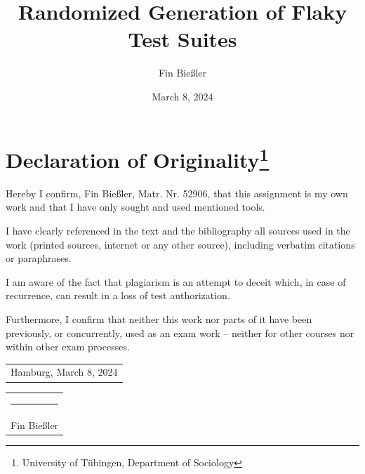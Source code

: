 \documentclass[
fancyheadings, %
%
%
]{stsreprt}
\author{Fin Bießler}
\title{Randomized Generation of Flaky Test Suites}
\date{March 8, 2024}
\begin{document}
\frontmatter
\maketitle

\chapter*{Declaration of Originality\footnote{University of Tübingen, Department of Sociology}}

Hereby I confirm, Fin Bießler, Matr. Nr. 52906, that this assignment is
my own work and that I have only sought and used mentioned tools. \newline

\noindent I have clearly referenced in the text and the bibliography all sources used in the work
(printed sources, internet or any other source), including verbatim citations or paraphrases. \newline

\noindent I am aware of the fact that plagiarism is an attempt to deceit which, in case of recurrence, can result in a loss of test authorization. \newline

\noindent Furthermore, I confirm that neither this work nor parts of it have been previously, or
concurrently, used as an exam work – neither for other courses nor within other exam
processes.

\vspace*{4em}
\begin{tabular}[t]{c}
  Hamburg, March 8, 2024
\end{tabular}%
\hfill%
\begin{tabular}[t]{l}
  \rule{10em}{0.4pt}\\ Fin Bießler
\end{tabular}%
\hfill\strut
\end{document}
